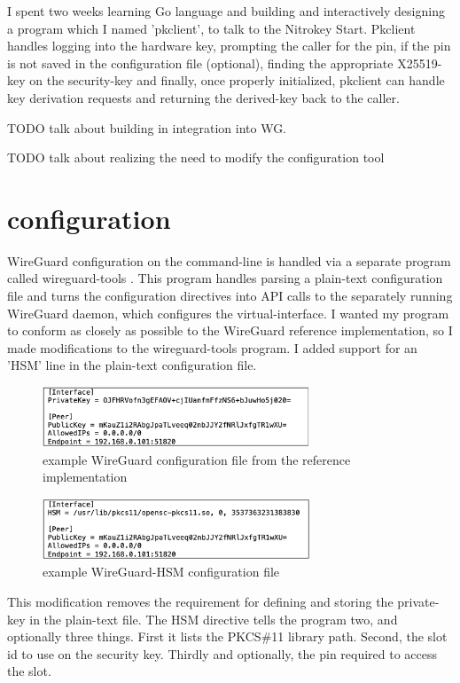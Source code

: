 \documentclass [11pt, proquest] {uwthesis}[2020/02/24]
\begin{document}
I spent two weeks learning Go language and building and interactively designing a program which I named 'pkclient', to talk to the Nitrokey Start. Pkclient handles logging into the hardware key, prompting the caller for the pin, if the pin is not saved in the configuration file (optional), finding the appropriate X25519-key on the security-key and finally, once properly initialized, pkclient can handle key derivation requests and returning the derived-key back to the caller.

TODO talk about building in integration into WG.

TODO talk about realizing the need to modify the configuration tool

\section{configuration}
WireGuard configuration on the command-line is handled via a separate program called wireguard-tools \cite{noauthor_wireguard-tools_2022}. This program handles parsing a plain-text configuration file and turns the configuration directives into API calls to the separately running WireGuard daemon, which configures the virtual-interface. I wanted my program to conform as closely as possible to the WireGuard reference implementation, so I made modifications to the wireguard-tools program. I added support for an 'HSM' line in the plain-text configuration file. 
\begin{figure}[ht]
\includegraphics[width=8cm]{paper/images/wg_conf_std.png}
\caption{example WireGuard configuration file from the reference implementation}
\label{fig:wg_config}
\end{figure}

\begin{figure}[ht]
\includegraphics[width=8cm]{paper/images/wg_conf_hsm.png}
\caption{example WireGuard-HSM configuration file}
\label{fig:hsm_config}
\end{figure}
This modification removes the requirement for defining and storing the private-key in the plain-text file. The HSM directive tells the program two, and optionally three things. First it lists the PKCS\#11 library path. Second, the slot id  to use on the security key. Thirdly and optionally, the pin required to access the slot.
\end{document}
